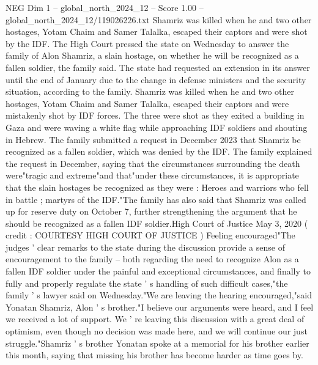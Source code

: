 \begin{textsample}{NEG Dim 1 – global\_north\_2024\_12 – Score 1.00 – global\_north\_2024\_12/119026226.txt}  \label{ex:f1_neg_227}
Shamriz was killed when he and two other hostages, Yotam Chaim and Samer Talalka, escaped their captors and were shot by the IDF.
The High Court pressed the state on Wednesday to answer the family of Alon Shamriz, a slain hostage, on whether he will be recognized as a fallen soldier, the family said.
The state had requested an extension in its answer until the end of January due to the change in defense ministers and the security situation, according to the family.
Shamriz was killed when he and two other hostages, Yotam Chaim and Samer Talalka, escaped their captors and were mistakenly shot by IDF forces.
The three were shot as they exited a building in Gaza and were waving a white flag while approaching IDF soldiers and shouting in Hebrew.
The family submitted a request in December 2023 that Shamriz be recognized as a fallen soldier, which was denied by the IDF.
The family explained the request in December, saying that the circumstances surrounding the death were"tragic and extreme"and that"under these circumstances, it is appropriate that the slain hostages be recognized as they were : Heroes and warriors who fell in battle ; martyrs of the IDF."The family has also said that Shamriz was called up for reserve duty on October 7, further strengthening the argument that he should be recognized as a fallen IDF soldier.High Court of Justice May 3, 2020 ( credit : COURTESY HIGH COURT OF JUSTICE ) Feeling encouraged"The judges ' clear remarks to the state during the discussion provide a sense of encouragement to the family -- both regarding the need to recognize Alon as a fallen IDF soldier under the painful and exceptional circumstances, and finally to fully and properly regulate the state ' s handling of such difficult cases,"the family ' s lawyer said on Wednesday."We are leaving the hearing encouraged,"said Yonatan Shamriz, Alon ' s brother."I believe our arguments were heard, and I feel we received a lot of support.
We ' re leaving this discussion with a great deal of optimism, even though no decision was made here, and we will continue our just struggle."Shamriz ' s brother Yonatan spoke at a memorial for his brother earlier this month, saying that missing his brother has become harder as time goes by.

\end{textsample}
